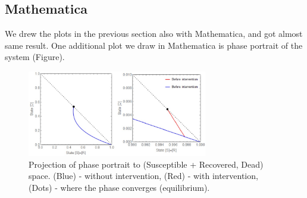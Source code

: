 \documentclass[10pt]{article}
\begin{document}
\newpage
\subsection{Mathematica}
We drew the plots in the previous section also with Mathematica, and got almost same result. One additional plot we draw in Mathematica is phase portrait of the system (Figure).

\begin{figure}[!h]
  \centering
  \includegraphics[width=0.7\textwidth]{PhasePortrait}
  \caption{Projection of phase portrait to (Susceptible + Recovered, Dead) space. (Blue) - without intervention, (Red) - with intervention, (Dots) - where the phase converges (equilibrium).}
\label{fig:Phase Portrait}
\end{figure}
\end{document}
